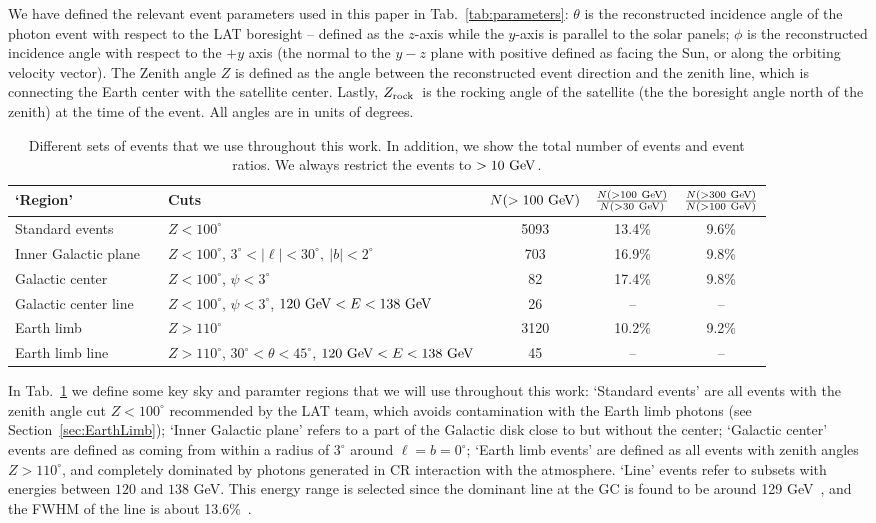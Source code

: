 \documentclass[aps,twocolumn,prd,superscriptaddress,showpacs,nofootinbib,fixfloat]{revtex4}
\newcommand{\GeV}{{\rm ~GeV}}
\newcommand{\zrock}{$Z_{\rm rock}$}
\begin{document}
We have defined the relevant event parameters used in this
paper in Tab.~\ref{tab:parameters}: $\theta$ is the
reconstructed incidence angle of the photon event with
respect to the LAT boresight -- defined as the $z$-axis
while the $y$-axis is parallel to the solar panels; $\phi$
is the reconstructed incidence angle with respect to the
$+y$ axis (the normal to the $y-z$ plane with positive
defined as facing the Sun, or along the orbiting velocity
vector). The Zenith angle $Z$ is defined as the angle
between the reconstructed event direction and the zenith
line, which is connecting the Earth center with the
satellite center.  Lastly, \zrock\ is the rocking angle of
the satellite (the the boresight angle north of the zenith)
at the time of the event.  All angles are in units of
degrees. 

\begin{table}
  \begin{tabular}{lllccc}
    \hline
    `Region' &&Cuts & $N(>100\GeV)$ & $\frac{N(>100\GeV)}{N(>30\GeV)}$ & $\frac{N(>300\GeV)}{N(>100\GeV)}$\\
    \hline
    Standard events      &  & $Z<100^\circ$ & 5093 & 13.4\% & 9.6\% \\
    Inner Galactic plane &  & $Z<100^\circ$, $3^\circ < |\ell| < 30^\circ,\ |b|<2^\circ$     & 703 & 16.9\% & 9.8\% \\
    Galactic center      &  & $Z<100^\circ$, $\psi<3^\circ$ & 82 & 17.4\% & 9.8\% \\
    Galactic center line &  & $Z<100^\circ$, $\psi<3^\circ$, $120\GeV<E<138\GeV$             & 26 & -- & -- \\
    Earth limb           &  & $Z>110^\circ$ & 3120 & 10.2\% & 9.2\% \\
    Earth limb line      &  & $Z>110^\circ$, $30^\circ<\theta<45^\circ$, $120\GeV<E<138\GeV$ & 45 & -- & -- \\ 
    \hline
  \end{tabular}
  \caption{Different sets of events that we use throughout this work. In
  addition, we show the total number of events and event ratios.
  We always restrict the events to $>10\GeV$.}
  \label{tab:regions}
\end{table}

In Tab.~\ref{tab:regions} we define some key sky and
paramter regions %
that we will use
throughout this work: `Standard events' are all events with
the zenith angle cut $Z<100^\circ$ recommended by the LAT
team, which
avoids contamination with the Earth limb photons (see
Section~\ref{sec:EarthLimb}); `Inner Galactic plane' refers to a part of the
Galactic disk close to but without the center;
`Galactic center' events are defined as coming from within
a radius of
$3^\circ$ around $\ell=b=0^\circ$; `Earth limb events' are
defined as all events with zenith angles $Z>110^\circ$, and
completely dominated by photons generated in CR interaction
with the atmosphere. `Line' events refer to subsets
with energies between $120$ and $138$ GeV. This energy range
is selected since the dominant line at the GC is found to be
around 129 GeV~\cite{linepaper}, and the FWHM of the line is
about 13.6\%~\cite{Weniger:2012}.
\end{document}
